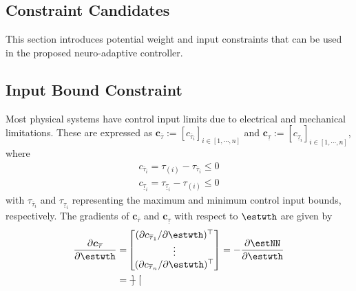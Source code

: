 \documentclass[lettersize,journal]{IEEEtran}
\begin{document}
\begin{appendices}

\section{Constraint Candidates}\label{sec:appen:cstr} 

This section introduces potential weight and input constraints that can be used in the proposed neuro-adaptive controller. 

\subsection{Input Bound Constraint}\label{sec:appen:input_bound_cstr}

Most physical systems have control input limits due to electrical and mechanical limitations. These are expressed as $\boldsymbol{c}_{\overline \tau}:= [c_{\overline \tau_i}]_{i\in[1,\cdots,n]}$ and $\boldsymbol{c}_{\underline\tau}:= [c_{\underline\tau_i}]_{i\in[1,\cdots,n]}$, where
\begin{equation}
    \begin{aligned}
        c_{\overline \tau_i}=\tau_{(i)} - {\tau_{\overline \tau_i}} \le 0
        \\
        c_{\underline\tau_i}={\tau_{\underline\tau_i}}-\tau_{(i)} \le 0
    \end{aligned}
    \label{eq. cstr input saturation}
\end{equation}
with $\tau_{\overline \tau_i}$ and $\tau_{\underline\tau_i}$ representing the maximum and minimum control input bounds, respectively.
The gradients of $\boldsymbol{c}_{\overline \tau}$ and $\boldsymbol{c}_{\underline\tau}$ with respect to $\estwth$ are given by
\begin{equation}
    \begin{aligned}
        {\partial \boldsymbol c_{\overline \tau} \over \partial \estwth}
        =& 
        \begin{bmatrix}
            (\partial c_{\overline \tau_1}/\partial \estwth)^\top \\
            \vdots \\
            (\partial c_{\overline \tau_n}/\partial \estwth)^\top
        \end{bmatrix}
            = -{\partial \estNN\over\partial\estwth}
            \\
        =&
        -\begin{bmatrix}

\end{bmatrix}
\end{aligned}
\end{equation}
\end{appendices}
\end{document}
